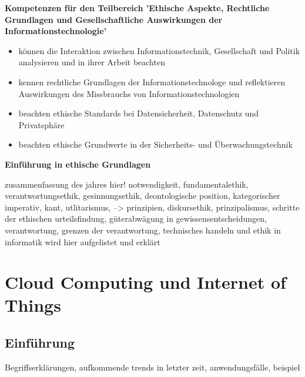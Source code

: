 \documentclass[letterpaper, 12pt]{article}
\let\tempsection\section
\renewcommand\section[1]{\vspace{-0.3cm}\tempsection{#1}\vspace{-0.3cm}}
\let\tempsubsection\subsection
\renewcommand\subsection[1]{\vspace{0cm}\tempsubsection{#1}\vspace{0cm}}
\begin{document}
\parindent 0pt
\parskip 6pt



\clearpage
\thispagestyle{empty}
\tableofcontents

\newpage
{}
\pagestyle{fancy}

\textbf{Kompetenzen für den Teilbereich 'Ethische Aspekte, Rechtliche Grundlagen und Gesellschaftliche Auswirkungen der Informationstechnologie'} \newline
\begin{itemize}
	\item können die Interaktion zwischen Informationstechnik, Gesellschaft und Politik analysieren und in ihrer Arbeit beachten
	\item kennen rechtliche Grundlagen der Informationstechnologe und reflektieren Auswirkungen des Missbrauchs von Informationstechnologien
	\item beachten ethische Standards bei Datensicherheit, Datenschutz und Privatsphäre
	\item beachten ethische Grundwerte in der Sicherheits- und Überwachungstechnik
\end{itemize}

\clearpage

\textbf{Einführung in ethische Grundlagen}

zusammenfassung des jahres hier! \newline
notwendigkeit, fundamentalethik, verantwortungsethik, gesinnungsethik, deontologische position, kategorischer imperativ, kant, utlitarismus, --> prinzipien, diskursethik, prinzipalismus, schritte der ethischen urteilsfindung, güterabwägung in gewissensentscheidungen, verantwortung, grenzen der verantwortung, technisches handeln und ethik in informatik wird hier aufgelistet und erklärt

\clearpage

\section{Cloud Computing und Internet of Things}

\subsection{Einführung}

Begriffserklärungen, aufkommende trends in letzter zeit, anwendungsfälle, beispiel
\end{document}
